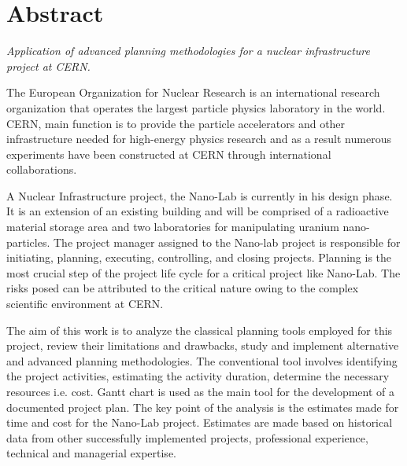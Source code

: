 %
%
%

\chapter*{\huge Abstract}
\begin{SingleSpace}
\emph{Application of advanced planning methodologies for a nuclear infrastructure project at CERN. }
\bigskip


The European Organization for Nuclear Research is an international research organization that operates the largest particle physics laboratory in the world. CERN, main function is to provide the particle accelerators and other infrastructure needed for high-energy physics research and as a result numerous experiments have been constructed at CERN through international collaborations.

A Nuclear Infrastructure project, the Nano-Lab is currently in his design phase. It is an extension of an existing building and will be comprised of a radioactive material storage area and two laboratories for manipulating uranium nano-particles. The project manager assigned to the Nano-lab project is responsible for initiating, planning, executing, controlling, and closing
projects. Planning is the most crucial step of the project life cycle for a critical project like Nano-Lab. The risks posed can be attributed to the critical nature owing to the complex scientific environment at CERN.

The aim of this work is to analyze the classical planning tools employed for this project, review their limitations and drawbacks, study and implement alternative and advanced planning methodologies. The conventional tool involves identifying the project activities, estimating the activity duration, determine the necessary resources i.e. cost. Gantt chart is used as the main tool for the development of a documented project plan. The key point of the analysis is the estimates
made for time and cost for the Nano-Lab project. Estimates are made based on historical data from other successfully implemented projects, professional experience, technical and managerial expertise.


\end{SingleSpace}
